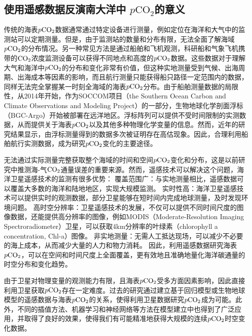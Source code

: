 \subsection{使用遥感数据反演南大洋中 \texorpdfstring{$p\mathrm{CO_2}$}{}的意义}
传统的海表$p\rm CO_2$数据通常通过特定设备进行测量，例如定位在海洋和大气中的监测站可以定期测量。但是，由于监测站的数量和分布有限，无法全面了解海域$p\rm CO_2$的分布情况。另一种常见方法是通过船舶和飞机观测，科研船和气象飞机携带的$\rm CO_2$浓度监测设备可以获得不同地点和高度的$p\rm CO_2$数据。这些数据对于理解大气和海洋中$p\rm CO_2$的分布和变化非常有价值，但这种实地测量受到气候、出海周期、出海成本等因素的影响，而且航行测量只能获得船只路径一定范围内的数据，同样无法完全掌握某一时刻全海域的海表$p\rm CO_2$分布。由于船舶测量数据的局限性，从2014年开始，作为SOCCOM项目（the Southern Ocean Carbon and Climate Observations and Modeling Project）的一部分，生物地球化学剖面浮标（BGC-Argo）开始被部署在远洋地区。浮标阵列可以提供不受时间限制的实测数据，从而提供关于海表$p\rm CO_2$以及其他多种物理化学变量的信息。然而，近年的研究结果显示\cite{wu2023controversial}，由浮标测量得到的数据多次被证明存在高估现象。因此，合理利用船舶航行实测数据，成为研究$p\rm CO_2$变化的主要途径。

无法通过实际测量完整获取整个海域的时间和空间$p\rm CO_2$变化和分布，这是以前研究中推测海-气$\rm CO_2$通量误差的重要来源。然而，遥感技术可以解决这个问题，海洋卫星遥感技术的监测有很多优势：
 覆盖范围广：与实地测量相比，遥感数据可以覆盖大多数的海洋和陆地地区，实现大规模监测。
实时性高：海洋卫星遥感技术可以提供实时的观测数据，部分卫星能够在短时间内完成地球测量，及时发现环境问题。
 高时空分辨率：卫星遥感技术的发展，不仅可以提供不同时间尺度的图像数据，还能提供高分辨率的图像，例如MODIS（Moderate-Resolution Imaging Spectroradiometer）卫星，可以获取4km分辨率的叶绿素（chlorophyll a concentration, Chl-a）图像。
 非实地测量：无需人工抵达现场，可以减少不必要的海上成本，从而减少大量的人力和物力消耗。
因此，利用遥感数据研究海表$p\rm CO_2$，可以在空间和时间尺度上全面覆盖，更有效地且准确地量化海洋碳通量的时空分布和变化趋势。

由于卫星对物理变量的观测能力有限，且海表$p\rm CO_2$受多方面因素影响，因此直接利用卫星获取$p\rm CO_2$存在一定难度。过去的研究通过建立基于回归模型\cite{JMA_MLR,Multiple_Linear_Regression,empirical_estimate}或生物地球模型\cite{Matear_Hirst_2012}的遥感数据与海表$p\rm CO_2$的关系，使得利用卫星数据研究$p\rm CO_2$成为可能。此外，不同的插值方法\cite{2012Spatio}、机器学习\cite{machine_learning_chen_2019,machine_learning_Bennington_2022}和神经网络\cite{friedrich2009neural,HYFZ202306005}等方法在模型建立中也得到了广泛应用，并取得了良好的效果，使得我们有可能精准地获得大规模的连续$p\rm CO_2$时空变化数据。

